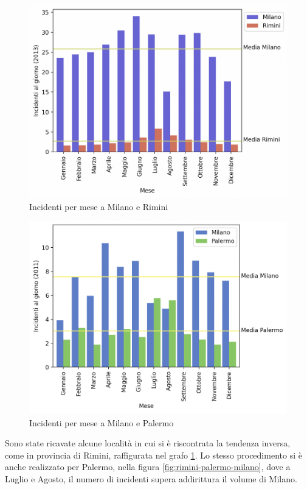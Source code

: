 \documentclass[a4paper]{report}
\begin{document}
\begin{figure}
    \includegraphics[width=\linewidth]{../src/incidenti/incidenti_senza_coords/mese_incidenti/milano_rimini.png}
    \caption{Incidenti per mese a Milano e Rimini}
    \label{fig:milano-rimini}
\end{figure}

\begin{figure}
    \includegraphics[width=\linewidth]{../src/incidenti/incidenti_senza_coords/mese_incidenti/palermo_milano.png}
    \caption{Incidenti per mese a Milano e Palermo}
    \label{fig:palermo-milano}
\end{figure}

Sono state ricavate alcune località in cui si è riscontrata la tendenza inversa, come in provincia 
di Rimini, raffigurata nel grafo \ref{fig:milano-rimini}.
Lo stesso procedimento si è anche realizzato per Palermo, nella figura \ref{fig:rimini-palermo-milano}, 
dove a Luglio e Agosto, il numero di incidenti supera addirittura il volume di Milano.
\end{document}

